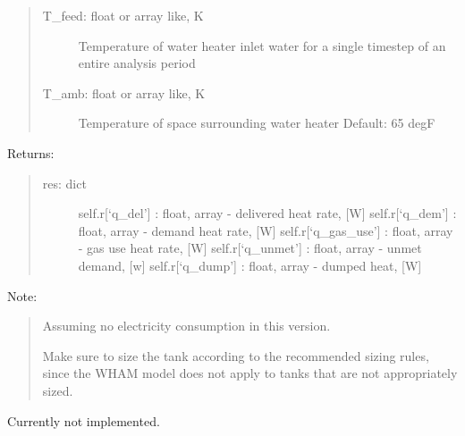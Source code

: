 \documentclass[letterpaper,10pt,english,openany]{sphinxmanual}
\begin{document}
\begin{fulllineitems}
\begin{fulllineitems}
\begin{quote}
\begin{description}
\item[{T\_feed: float or array like, K}] \leavevmode
Temperature of water heater inlet water for
a single timestep of an entire analysis period

\item[{T\_amb: float or array like, K}] \leavevmode
Temperature of space surrounding water heater
Default: 65 degF

\end{description}
\end{quote}

Returns:
\begin{quote}
\begin{description}
\item[{res: dict}] \leavevmode
self.r{[}‘q\_del’{]} : float, array - delivered heat rate, {[}W{]}
self.r{[}‘q\_dem’{]} : float, array - demand heat rate, {[}W{]}
self.r{[}‘q\_gas\_use’{]} : float, array - gas use heat rate, {[}W{]}
self.r{[}‘q\_unmet’{]} : float, array - unmet demand, {[}w{]}
self.r{[}‘q\_dump’{]} : float, array - dumped heat, {[}W{]}

\end{description}
\end{quote}

Note:
\begin{quote}

Assuming no electricity consumption in this version.

Make sure to size the tank according to the recommended
sizing rules, since the WHAM model does not apply to
tanks that are not appropriately sized.
\end{quote}

\end{fulllineitems}


\begin{fulllineitems}
\label{\detokenize{source/mswh.system:mswh.system.components.Storage.setup_electric}}
Currently not implemented.

\end{fulllineitems}



\end{fulllineitems}
\end{document}
